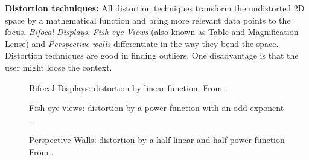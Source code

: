 \textbf{Distortion techniques:} All distortion techniques transform the undistorted 2D space by a mathematical function and bring more relevant data points to the focus. \textit{Bifocal Displays}, \textit{Fish-eye Views} (also known as Table and Magnification Lense) and \textit{Perspective walls} differentiate in the way they bend the space. Distortion techniques are good in finding outliers. One disadvantage is that the user might loose the context.
\begin{figure}[H]
    \centering
    \caption{Bifocal Displays: distortion by linear function. From \cite{Stroe1999}.}
    \label{fig:bifocal}
\end{figure}

\begin{figure}[H]
    \centering
    \caption{Fish-eye views:  distortion by a power function with an odd exponent \cite{Stroe1999}.}
    \label{fig:fisheye}
\end{figure}

\begin{figure}[H]
    \centering
    \caption{Perspective Walls: distortion by a half linear and half power function From \cite{Stroe1999}.}
    \label{fig:perspectivewall}
\end{figure}
\par


